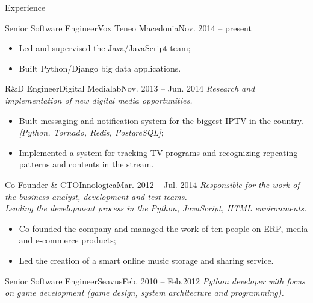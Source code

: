 \documentclass[]{mcdowellcv}
\begin{document}
    \begin{cvsection}{Experience}
    \label{Employment Record}
        \begin{cvsubsection}{Senior Software Engineer}{Vox Teneo Macedonia}{Nov. 2014 -- present}
            \begin{itemize}
                \item Led and supervised the Java/JavaScript team;
                \item Built Python/Django big data applications.
            \end{itemize}
        \end{cvsubsection}
        \begin{cvsubsection}{R\&D Engineer}{Digital Medialab}{Nov. 2013 -- Jun. 2014}
            \textit{Research and implementation of new digital media opportunities.}
            \begin{itemize}
                \item Built messaging and notification system for the biggest IPTV in the country.
                    \textit{[Python, Tornado, Redis, PostgreSQL]};
                \item Implemented a system for tracking TV programs and recognizing repeating patterns and contents in the stream.
            \end{itemize}
        \end{cvsubsection}
        \begin{cvsubsection}{Co-Founder \& CTO}{Innologica}{Mar. 2012 -- Jul. 2014}
            \textit{Responsible for the work of the business analyst, development and test teams.}\\
            \textit{Leading the development process in the Python, JavaScript, HTML environments.}
            \begin{itemize}
                \item Co-founded the company and managed the work of ten people on ERP, media and e-commerce products;
                \item Led the creation of a smart online music storage and sharing service.
            \end{itemize}
        \end{cvsubsection}
        \begin{cvsubsection}{Senior Software Engineer}{Seavus}{Feb. 2010 -- Feb.2012}
            \textit{Python developer with focus on game development (game design, system architecture and programming).}

\end{cvsubsection}
\end{cvsection}
\end{document}
